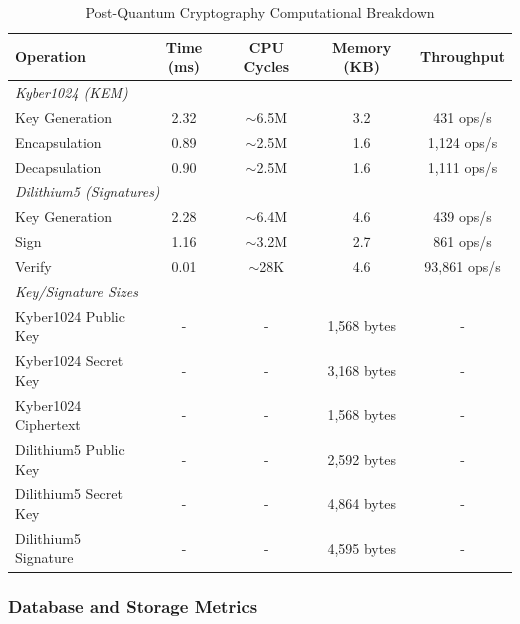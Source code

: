 \documentclass[12pt,a4paper]{article}
\begin{document}
\begin{table}[H]
\centering
\caption{Post-Quantum Cryptography Computational Breakdown}
\begin{tabular}{lcccc}
\toprule
\textbf{Operation} & \textbf{Time (ms)} & \textbf{CPU Cycles} & \textbf{Memory (KB)} & \textbf{Throughput} \\
\midrule
\multicolumn{5}{l}{\textit{Kyber1024 (KEM)}} \\
Key Generation & 2.32 & $\sim$6.5M & 3.2 & 431 ops/s \\
Encapsulation & 0.89 & $\sim$2.5M & 1.6 & 1,124 ops/s \\
Decapsulation & 0.90 & $\sim$2.5M & 1.6 & 1,111 ops/s \\
\midrule
\multicolumn{5}{l}{\textit{Dilithium5 (Signatures)}} \\
Key Generation & 2.28 & $\sim$6.4M & 4.6 & 439 ops/s \\
Sign & 1.16 & $\sim$3.2M & 2.7 & 861 ops/s \\
Verify & 0.01 & $\sim$28K & 4.6 & 93,861 ops/s \\
\midrule
\multicolumn{5}{l}{\textit{Key/Signature Sizes}} \\
Kyber1024 Public Key & - & - & 1,568 bytes & - \\
Kyber1024 Secret Key & - & - & 3,168 bytes & - \\
Kyber1024 Ciphertext & - & - & 1,568 bytes & - \\
Dilithium5 Public Key & - & - & 2,592 bytes & - \\
Dilithium5 Secret Key & - & - & 4,864 bytes & - \\
Dilithium5 Signature & - & - & 4,595 bytes & - \\
\bottomrule
\end{tabular}
\end{table}

\subsubsection{Database and Storage Metrics}
\end{document}
